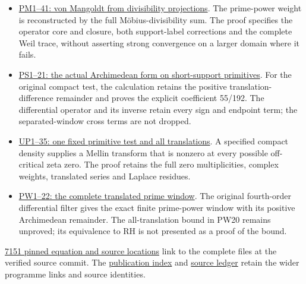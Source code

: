 \documentclass[
]{article}
\providecommand{\tightlist}{%
  \setlength{\itemsep}{0pt}\setlength{\parskip}{0pt}}
\begin{document}
\begin{itemize}
\tightlist
\item
  \href{https://github.com/KokunoYumeto/zeta-function-research-reader/blob/84edd11df011c3e161a57dad9f083276a3c0bb95/workbenches/splitzero-tandem/branches/tau-zero-prime-positivity/PRIME_PROJECTOR_MOBIUS_DERIVATION.tex}{PM1--41:
  von Mangoldt from divisibility projections}. The prime-power weight is
  reconstructed by the full Möbius-divisibility sum. The proof specifies
  the operator core and closure, both support-label corrections and the
  complete Weil trace, without asserting strong convergence on a larger
  domain where it fails.
\item
  \href{https://github.com/KokunoYumeto/zeta-function-research-reader/blob/84edd11df011c3e161a57dad9f083276a3c0bb95/workbenches/splitzero-tandem/branches/tau-zero-prime-positivity/PRIMITIVE_SHORT_SUPPORT_DERIVATION.tex}{PS1--21:
  the actual Archimedean form on short-support primitives}. For the
  original compact test, the calculation retains the positive
  translation-difference remainder and proves the explicit coefficient
  55/192. The differential operator and its inverse retain every sign
  and endpoint term; the separated-window cross terms are not dropped.
\item
  \href{https://github.com/KokunoYumeto/zeta-function-research-reader/blob/84edd11df011c3e161a57dad9f083276a3c0bb95/workbenches/splitzero-tandem/branches/tau-zero-prime-positivity/UNIVERSAL_PRIMITIVE_TRANSLATION_CRITERION.tex}{UP1--35:
  one fixed primitive test and all translations}. A specified compact
  density supplies a Mellin transform that is nonzero at every possible
  off-critical zeta zero. The proof retains the full zero
  multiplicities, complex weights, translated series and Laplace
  residues.
\item
  \href{https://github.com/KokunoYumeto/zeta-function-research-reader/blob/84edd11df011c3e161a57dad9f083276a3c0bb95/workbenches/splitzero-tandem/branches/tau-zero-prime-positivity/PRIMITIVE_PRIME_WINDOW_DERIVATION.tex}{PW1--22:
  the complete translated prime window}. The original fourth-order
  differential filter gives the exact finite prime-power window with its
  positive Archimedean remainder. The all-translation bound in PW20
  remains unproved; its equivalence to RH is not presented as a proof of
  the bound.
\end{itemize}

\href{PINNED_PROOF_LINKS.json}{7151 pinned equation and source
locations} link to the complete files at the verified source commit. The
\href{https://github.com/KokunoYumeto/zeta-function-research-reader/blob/84edd11df011c3e161a57dad9f083276a3c0bb95/workbenches/splitzero-tandem/branches/tau-zero-prime-positivity/PUBLICATION_INDEX.json}{publication
index} and
\href{https://github.com/KokunoYumeto/zeta-function-research-reader/blob/84edd11df011c3e161a57dad9f083276a3c0bb95/workbenches/splitzero-tandem/branches/tau-zero-prime-positivity/SOURCES.md}{source
ledger} retain the wider programme links and source identities.
\end{document}
